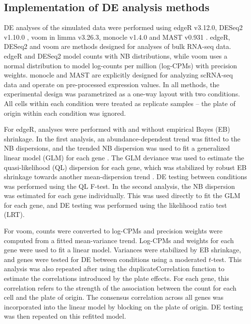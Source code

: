 \documentclass{article}
\begin{document}
\subsection{Implementation of DE analysis methods}
DE analyses of the simulated data were performed using edgeR v3.12.0, DESeq2 v1.10.0 \cite{love2014moderated}, voom \cite{law2014voom} in limma v3.26.3, 
    monocle v1.4.0 and MAST v0.931 \cite{finak2015mast}.
edgeR, DESeq2 and voom are methods designed for analyses of bulk RNA-seq data.
edgeR and DESeq2 model counts with NB distributions, while voom uses a normal distribution to model log-counts per million (log-CPMs) with precision weights.
monocle and MAST are explicitly designed for analyzing scRNA-seq data and operate on pre-processed expression values.
In all methods, the experimental design was parametrized as a one-way layout with two conditions.
All cells within each condition were treated as replicate samples -- the plate of origin within each condition was ignored.

For edgeR, analyses were performed with and without empirical Bayes (EB) shrinkage.
In the first analysis, an abundance-dependent trend was fitted to the NB dispersions, 
    and the trended NB dispersion was used to fit a generalized linear model (GLM) for each gene \cite{mccarthy2012differential}.
The GLM deviance was used to estimate the quasi-likelihood (QL) dispersion for each gene, 
    which was stabilized by robust EB shrinkage towards another mean-dispersion trend \cite{lund2012detecting}.
DE testing between conditions was performed using the QL F-test.
In the second analysis, the NB dispersion was estimated for each gene individually.
This was used directly to fit the GLM for each gene, and DE testing was performed using the likelihood ratio test (LRT).

For voom, counts were converted to log-CPMs and precision weights were computed from a fitted mean-variance trend.
Log-CPMs and weights for each gene were used to fit a linear model.
Variances were stabilized by EB shrinkage, and genes were tested for DE between conditions using a moderated $t$-test.
This analysis was also repeated after using the duplicateCorrelation function to estimate the correlations introduced by the plate effects.
For each gene, this correlation refers to the strength of the association between the count for each cell and the plate of origin.
The consensus correlation across all genes was incorporated into the linear model by blocking on the plate of origin.
DE testing was then repeated on this refitted model.
\end{document}
